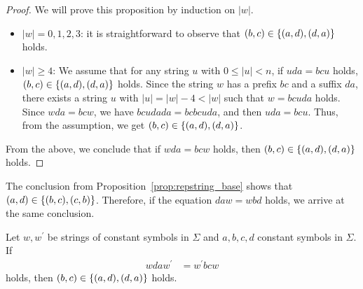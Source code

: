 \begin{proof}
  We will prove this proposition by induction on $|w|$.
  \begin{itemize}
  \item $|w| = 0,1,2,3$: it is straightforward to observe that $(b,c) \in \{(a,d), (d,a)\}$ holds.
  \item $|w| \ge 4$: We assume that for any string $u$ with $0\leq |u| < n$, if $uda = bcu$ holds, $(b,c) \in \{(a,d), (d,a)\}$ holds. Since the string $w$ has a prefix $bc$ and a suffix $da$, there exists a string $u$ with $|u| = |w| - 4 < |w|$ such that $w = bcuda$ holds. Since $wda = bcw$, we have $bcudada = bcbcuda$, and then $uda = bcu$. Thus, from the assumption, we get $(b,c) \in \{(a,d), (d,a)\}$.
  \end{itemize}
From the above, we conclude that if $wda = bcw$ holds, then $(b,c) \in \{(a,d), (d,a)\}$ holds.
\end{proof}

The conclusion from Proposition~\ref{prop:repstring_base} shows that $(a,d) \in \{(b,c), (c,b)\}$. Therefore, if the equation $daw = wbd$ holds, we arrive at the same conclusion.

\begin{prop}\label{prop:repstring}
Let $w,w^{\prime}$ be strings of constant symbols in $\Sigma$ and $a,b,c,d$ constant symbols in $\Sigma$.
If
\begin{align}
  wdaw^{\prime} & = w^{\prime}bcw\label{eq:repstring}
\end{align}
holds, then $(b,c) \in \{(a,d), (d,a)\}$ holds.\label{prop:repstring_eq}
\end{prop}

